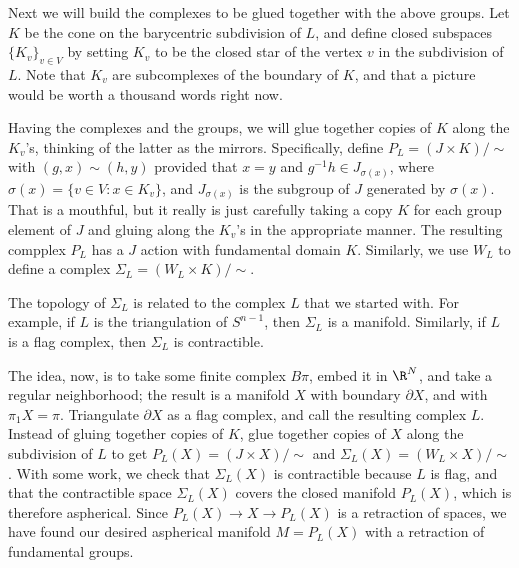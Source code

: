 Next we will build the complexes to be glued together with the above groups.  Let $K$ be the cone on the barycentric subdivision of $L$, and define closed subspaces $\{ K_v \}_{v \in V}$ by setting $K_v$ to be the closed star of the vertex $v$ in the subdivision of $L$.  Note that $K_v$ are subcomplexes of the boundary of $K$, and that a picture would be worth a thousand words right now.

Having the complexes and the groups, we will glue together copies of $K$ along the $K_v$'s, thinking of the latter as the mirrors.  Specifically, define $P_L = (J \times K)/\sim$ with $(g,x) \sim (h,y)$ provided that $x = y$ and $g^{-1} h \in J_{\sigma(x)}$, where $\sigma(x) = \{ v \in V : x \in K_v \}$, and $J_{\sigma(x)}$ is the subgroup of $J$ generated by $\sigma(x)$.  That is a mouthful, but it really is just carefully taking a copy $K$ for each group element of $J$ and gluing along the $K_v$'s in the appropriate manner.  The resulting compplex $P_L$ has a $J$ action with fundamental domain $K$.  Similarly, we use $W_L$ to define a complex $\Sigma_L = (W_L \times K)/\sim$.

The topology of $\Sigma_L$ is related to the complex $L$ that we started with.  For example, if $L$ is the triangulation of $S^{n-1}$, then $\Sigma_L$ is a manifold.  Similarly, if $L$ is a flag complex, then $\Sigma_L$ is contractible.

The idea, now, is to take some finite complex $B\pi$, embed it in $\R^N$, and take a regular neighborhood; the result is a manifold $X$ with boundary $\partial X$, and with $\pi_1 X = \pi$.  Triangulate $\partial X$ as a flag complex, and call the resulting  complex $L$.  Instead of gluing together copies of $K$, glue together copies of $X$ along the subdivision of $L$ to get $P_L(X) = (J \times X)/\sim$ and $\Sigma_L(X) = (W_L \times X)/\sim$.  With some work, we check that $\Sigma_L(X)$ is contractible because $L$ is flag, and that the contractible space $\Sigma_L(X)$ covers the closed manifold $P_L(X)$, which is therefore aspherical.  Since $P_L(X) \to X \to P_L(X)$ is a retraction of spaces, we have found our desired aspherical manifold $M = P_L(X)$ with a retraction of fundamental groups.

